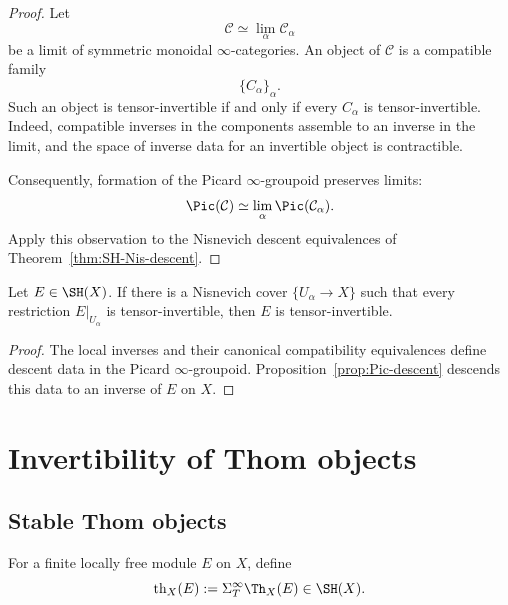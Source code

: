 \begin{proof}
Let
\[
    \mathcal C
    \simeq
    \lim_\alpha\mathcal C_\alpha
\]
be a limit of symmetric monoidal \(\infty\)-categories.  An object of
\(\mathcal C\) is a compatible family
\[
    \{C_\alpha\}_\alpha.
\]
Such an object is tensor-invertible if and only if every \(C_\alpha\) is
tensor-invertible.  Indeed, compatible inverses in the components assemble
to an inverse in the limit, and the space of inverse data for an invertible
object is contractible.

Consequently, formation of the Picard \(\infty\)-groupoid preserves limits:
\[
    \Pic(\mathcal C)
    \simeq
    \lim_\alpha\Pic(\mathcal C_\alpha).
\]
Apply this observation to the Nisnevich descent equivalences of
Theorem~\ref{thm:SH-Nis-descent}.
\end{proof}

\begin{corollary}
\label{cor:invertibility-local}
Let $E\in\SH(X)$.  If there is a Nisnevich cover $\{U_\alpha\to X\}$ such that every restriction
$E|_{U_\alpha}$ is tensor-invertible, then $E$ is tensor-invertible.
\end{corollary}

\begin{proof}
The local inverses and their canonical compatibility equivalences define descent data in the Picard
$\infty$-groupoid.  Proposition~\ref{prop:Pic-descent} descends this data to an inverse of $E$ on
$X$.
\end{proof}

\section{Invertibility of Thom objects}
\label{sec:thom-invertibility}

\subsection{Stable Thom objects}

\begin{definition}
\label{def:stable-thom-object}
For a finite locally free module $E$ on $X$, define
\[
    \operatorname{th}_X(E)
    :=
    \Sigma_T^\infty\Th_X(E)
    \in
    \SH(X).
\]
\end{definition}

